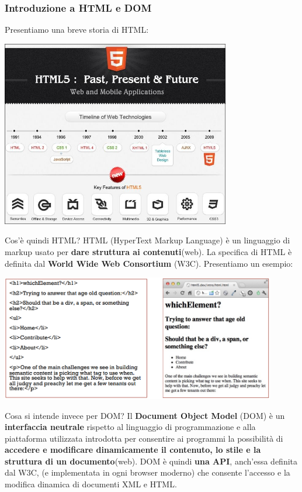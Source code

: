 \documentclass[12pt]{article}
\begin{document}
\subsubsection{Introduzione a HTML e DOM}
Presentiamo una breve storia di HTML:
\begin{center}
    \includegraphics[width = 0.75\textwidth]{Images/152.jpg}
\end{center}
Cos'è quindi HTML? HTML (HyperText Markup Language) è un linguaggio di markup usato per \textbf{dare struttura ai contenuti}(web). La specifica di HTML è
definita dal \textbf{World Wide Web Consortium} (W3C). Presentiamo un esempio:
\begin{center}
    \includegraphics[width = 0.90\textwidth]{Images/153.PNG}
\end{center}
Cosa si intende invece per DOM? Il \textbf{Document Object Model} (DOM) è un \textbf{interfaccia neutrale} rispetto al linguaggio di programmazione e alla piattaforma utilizzata
introdotta per consentire ai programmi la possibilità di \textbf{accedere e modificare dinamicamente il contenuto, lo stile e la struttura di un documento}(web).
DOM è quindi \textbf{una API}, anch'essa definita dal W3C, (e implementata in ogni browser moderno) che consente l'accesso e la modifica dinamica di documenti XML e HTML. \newline
\end{document}
